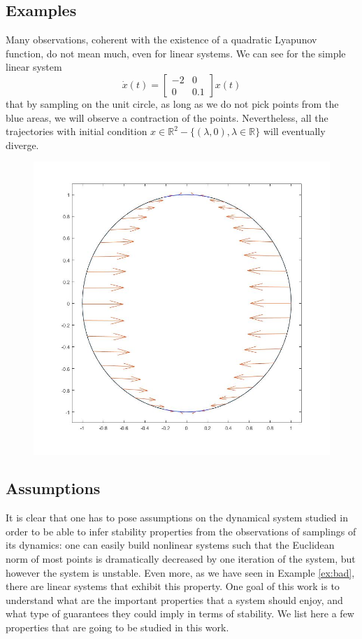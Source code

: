 \documentclass[letterpaper, 10 pt, conference]{ieeeconf}  %
\newcommand{\R}{\mathbb{R} }
\begin{document}
\subsection{Examples}

Many observations, coherent with the existence of a quadratic Lyapunov function, do not mean much, even for linear systems. We can see for the simple linear system
\[
\dot{x}(t) =
\begin{bmatrix}
-2 & 0\\
0 & 0.1
\end{bmatrix} 
x(t)\]
that by sampling on the unit circle, as long as we do not pick points from the blue areas, we will observe a contraction of the points. Nevertheless, all the trajectories with initial condition $x \in \R^2 - \{(\lambda,0), \lambda \in \R\}$ will eventually diverge.


\begin{figure}[h]
\includegraphics[scale=0.25]{example.jpg}
\end{figure}


\subsection{Assumptions}
It is clear that one has to pose assumptions on the dynamical system studied in order to be able to infer stability properties from the observations of samplings of its dynamics: one can easily build nonlinear systems such that the Euclidean norm of most points is dramatically decreased by one iteration of the system, but however the system is unstable.  Even more, as we have seen in Example \ref{ex:bad}, there are linear systems that exhibit this property.  One goal of this work is to understand what are the important properties that a system should enjoy, and what type of guarantees they could imply in terms of stability.  We list here a few properties that are going to be studied in this work.
\end{document}
